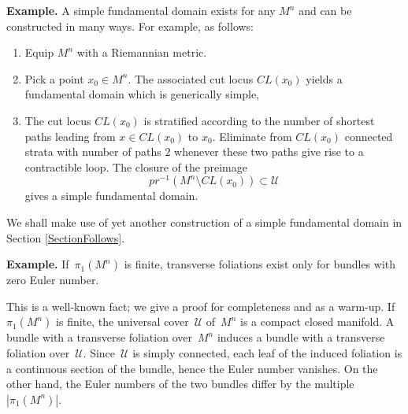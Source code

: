 \documentclass[12pt]{amsart}
\theoremstyle{plain}
\theoremstyle{definition}
\theoremstyle{plain}
\theoremstyle{definition}
\begin{document}
\textbf{Example.}
  A simple fundamental domain exists for any $M^n$ and can be constructed in many ways. For example,
  as follows: 

  \begin{enumerate}
                                                                                        \item Equip $M^n$ with a  Riemannian metric.
                                                                                        \item Pick a point $x_0\in M^n$. The associated cut locus $CL(x_0)$
                                                                                        yields a  fundamental domain which is generically simple, \textcolor{red}{} 
                                                                                        \item The cut locus $CL(x_0)$ is stratified according to the number of shortest paths leading from $x\in CL(x_0)$ to $x_0$. Eliminate from $CL(x_0)$ connected strata with number of paths $2$ whenever these two paths give rise to a contractible loop.  The closure of the {preimage} $$pr^{-1}(M^n \setminus CL(x_0))\subset \mathcal{U}$$ gives a simple    fundamental domain.
                                                                                      \end{enumerate}
                                                                                   

We shall make use of yet another construction of a simple fundamental domain in Section \ref{SectionFollows}.

\bigskip




\medskip
\iffalse
\textbf{Example. } 
If~$\pi_1(M^n)$ is finite, transverse foliations exist only for bundles with zero Euler number.

This is a well-known fact; we give a proof for completeness and as a warm-up.
If~$\pi_1(M^n)$ is finite, the universal cover~$\mathcal{U}$ of~$M^n$ is a compact closed manifold. A bundle with a transverse foliation over~$M^n$ induces a bundle with a transverse foliation over~$\mathcal{U}$. 
Since~$\mathcal{U}$ is simply connected, each leaf of the induced foliation is a continuous section of the bundle, hence the Euler number vanishes. 
On the other hand, the Euler numbers of the two bundles differ by the multiple~$|\pi_1(M^n)|$. 
\end{document}
